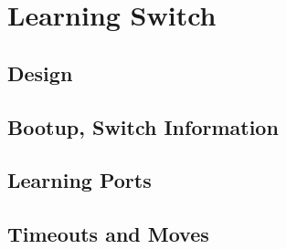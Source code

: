 \chapter{Learning Switch}

\section{Design}
 \label{l2_learning_switch:install}

\section{Bootup, Switch Information}

\section{Learning Ports}

\section{Timeouts and Moves}
